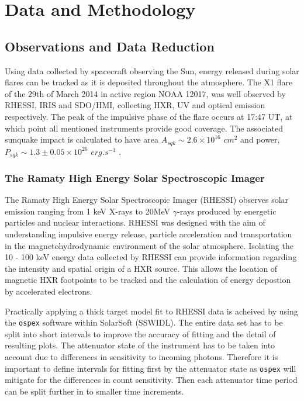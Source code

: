 \documentclass[11pt]{article}
\begin{document}
\section{Data and Methodology}
\subsection{Observations and Data Reduction}
Using data collected by spacecraft observing the Sun, energy released during solar flares can be tracked as it is deposited throughout the atmosphere. The X1 flare of the 29th of March 2014 in active region NOAA 12017, was well observed by RHESSI, IRIS and SDO/HMI, collecting HXR, UV and optical emission respectively. The peak of the impulsive phase of the flare occurs at 17:47 UT, at which point all mentioned instruments provide good coverage. The associated sunquake impact is calculated to have area $A_{sqk} \sim 2.6{\times}10^{16}$ $cm^{2}$ and power, $P_{sqk} \sim 1.3\pm0.05{\times}10^{26}$ $erg.s^{-1}$ \citep{2014ApJ...796...85J}.

\subsubsection{The Ramaty High Energy Solar Spectroscopic Imager}\label{rhessi}
The Ramaty High Energy Solar Spectroscopic Imager (RHESSI) observes solar emission ranging from 1 keV X-rays to 20MeV $\gamma$-rays produced by energetic particles and nuclear interactions. RHESSI was designed with the aim of understanding impulsive energy release, particle acceleration and transportation in the magnetohydrodynamic environment of the solar atmosphere. Isolating the 10 - 100 keV energy data collected by RHESSI can provide information regarding the intensity and spatial origin of a HXR source. This allows the location of magnetic HXR footpoints to be tracked and the calculation of energy depostion by accelerated electrons. 
  
Practically applying a thick target model fit to RHESSI data is acheived by using the \texttt{ospex} software within SolarSoft (SSWIDL). The entire data set has to be split into short intervals to improve the accuracy of fitting and the detail of resulting plots. The attenuator state of the instrument has to be taken into account due to differences in sensitivity to incoming photons. Therefore it is important to define intervals for fitting first by the attenuator state as \texttt{ospex} will mitigate for the differences in count sensitivity. Then each attenuator time period can be split further in to smaller time increments. 
\end{document}
